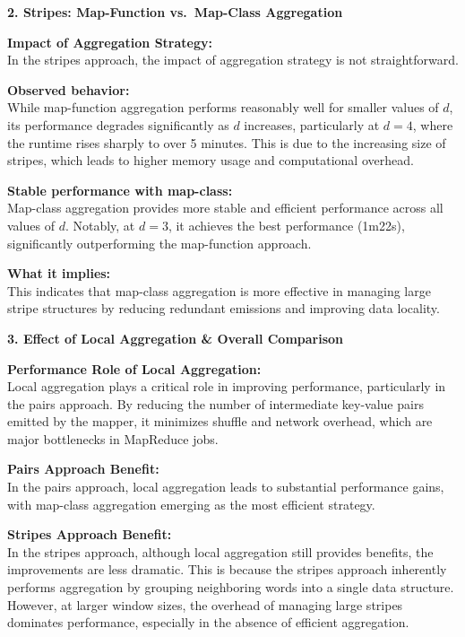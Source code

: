\documentclass[12pt,a4paper]{article}
\begin{document}
\begin{infobox}
  \textbf{2. Stripes: Map-Function vs.\ Map-Class Aggregation}
  \vspace{0.5em}
  
  \textbf{Impact of Aggregation Strategy:} \\
  In the stripes approach, the impact of aggregation strategy is not straightforward.
  \vspace{0.5em}
  
  \textbf{Observed behavior:} \\
  While map-function aggregation performs reasonably well for smaller values of $d$, its performance degrades significantly as $d$ increases, particularly at $d = 4$, where the runtime rises sharply to over 5 minutes. This is due to the increasing size of stripes, which leads to higher memory usage and computational overhead.
  \vspace{0.5em}
  
  \textbf{Stable performance with map-class:} \\
  Map-class aggregation provides more stable and efficient performance across all values of $d$. Notably, at $d = 3$, it achieves the best performance (1m22s), significantly outperforming the map-function approach.
  \vspace{0.5em}
  
  \textbf{What it implies:} \\
  This indicates that map-class aggregation is more effective in managing large stripe structures by reducing redundant emissions and improving data locality.
\end{infobox}
\clearpage
\begin{infobox}
  \textbf{3. Effect of Local Aggregation \& Overall Comparison}
  \vspace{0.5em}
  
  \textbf{Performance Role of Local Aggregation:} \\
  Local aggregation plays a critical role in improving performance, particularly in the pairs approach. By reducing the number of intermediate key-value pairs emitted by the mapper, it minimizes shuffle and network overhead, which are major bottlenecks in MapReduce jobs.
  \vspace{0.5em}
  
  \textbf{Pairs Approach Benefit:} \\
  In the pairs approach, local aggregation leads to substantial performance gains, with map-class aggregation emerging as the most efficient strategy.
  \vspace{0.5em}

  \textbf{Stripes Approach Benefit:} \\
  In the stripes approach, although local aggregation still provides benefits, the improvements are less dramatic. This is because the stripes approach inherently performs aggregation by grouping neighboring words into a single data structure. However, at larger window sizes, the overhead of managing large stripes dominates performance, especially in the absence of efficient aggregation.
\end{infobox}
\end{document}
